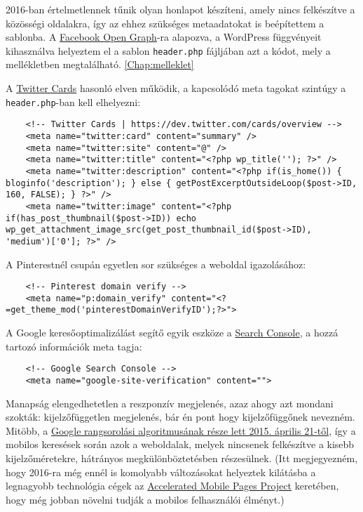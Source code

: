 2016-ban értelmetlennek tűnik olyan honlapot készíteni, amely nincs felkészítve a közösségi oldalakra, így az ehhez szükséges metaadatokat is beépítettem a sablonba. A \href{https://developers.facebook.com/docs/sharing/webmasters}{Facebook Open Graph}-ra alapozva, a WordPress függvényeit kihasználva helyeztem el a sablon \texttt{header.php} fájljában azt a kódot, mely a mellékletben megtalálható. \ref{Chap:melleklet}

A \href{https://dev.twitter.com/cards/overview}{Twitter Cards} hasonló elven működik, a kapcsolódó meta tagokat szintúgy a \texttt{header.php}-ban kell elhelyezni:

\begin{lstlisting}
	<!-- Twitter Cards | https://dev.twitter.com/cards/overview -->
	<meta name="twitter:card" content="summary" />
	<meta name="twitter:site" content="@" />
	<meta name="twitter:title" content="<?php wp_title(''); ?>" />
	<meta name="twitter:description" content="<?php if(is_home()) { bloginfo('description'); } else { getPostExcerptOutsideLoop($post->ID, 160, FALSE); } ?>" />
	<meta name="twitter:image" content="<?php if(has_post_thumbnail($post->ID)) echo wp_get_attachment_image_src(get_post_thumbnail_id($post->ID), 'medium')['0']; ?>" />
\end{lstlisting}

A Pinterestnél csupán egyetlen sor szükséges a weboldal igazolásához:

\begin{lstlisting}
	<!-- Pinterest domain verify -->
	<meta name="p:domain_verify" content="<?=get_theme_mod('pinterestDomainVerifyID');?>">
\end{lstlisting}

A Google keresőoptimalizálást segítő egyik eszköze a \href{https://www.google.com/webmasters/tools/home?hl=HU}{Search Console}, a hozzá tartozó információk meta tagja:

\begin{lstlisting}
	<!-- Google Search Console -->
	<meta name="google-site-verification" content="">
\end{lstlisting}


Manapság elengedhetetlen a reszponzív megjelenés, azaz ahogy azt mondani szokták: kijelzőfüggetlen megjelenés, bár én pont hogy kijelzőfüggőnek nevezném. Mitöbb, a \href{https://webmasters.googleblog.com/2015/02/finding-more-mobile-friendly-search.html}{Google rangsorolási algoritmusának része lett 2015. április 21-től}, így a mobilos keresések során azok a weboldalak, melyek nincsenek felkészítve a kisebb kijelzőméretekre, hátrányos megkülönböztetésben részesülnek. (Itt megjegyezném, hogy 2016-ra még ennél is komolyabb változásokat helyeztek kilátásba a legnagyobb technológia cégek az \href{https://www.ampproject.org/}{Accelerated Mobile Pages Project} keretében, hogy még jobban növelni tudják a mobilos felhasználói élményt.)

